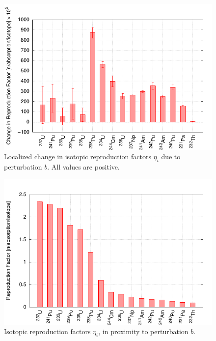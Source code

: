 \documentclass[11pt]{article}
\begin{document}
\clearpage
\begin{figure}[p]
  \centering
  \includegraphics[width=\textwidth, trim=0 0 0 0, clip]{./img/Th-b-IsotopeDeltaEta.pdf}
  \caption{Localized change in isotopic reproduction factors $\eta_i$ due to perturbation $b$. All values are positive.}
  \label{fig:deltaEtaI}
\end{figure}

\clearpage
\begin{figure}[p]
  \centering
  \includegraphics[width=\textwidth, trim=0 0 0 0.275in, clip]{./img/Th-b-IsotopeEta.pdf}
  \caption{Isotopic reproduction factors $\eta_i$, in proximity to perturbation $b$.}
  \label{fig:etaI}
\end{figure}
\end{document}
